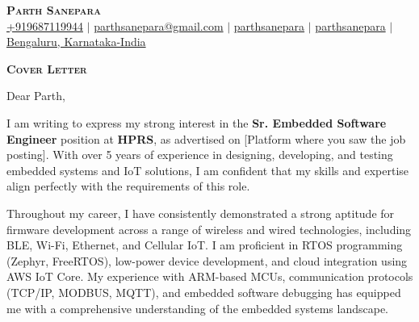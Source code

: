 \documentclass[letterpaper,11pt]{article}
\newcommand{\HiringManager}{Parth}
\newcommand{\CompanyName}{HPRS}
\newcommand{\Position}{Sr. Embedded Software Engineer}
\begin{document}

\begin{center}
    \textbf{\Huge \scshape Parth Sanepara} \\ \vspace{3pt}
    \small
    \faMobile \hspace{.5pt} \href{tel:9687119944}{+919687119944}
    $|$
    \faAt \hspace{.5pt} \href{mailto:parthsanepara@gmail.com}{parthsanepara@gmail.com}
    $|$
    \faLinkedinSquare \hspace{.5pt} \href{https://www.linkedin.com/in/parthsanepara}{parthsanepara}
    $|$
    \faGithub \hspace{.5pt} \href{https://github.com/parthsanepara}{parthsanepara}
    $|$
    \faMapMarker \hspace{.5pt} \href{https://maps.app.goo.gl/cc5ibm6jAiXmRFp17}{Bengaluru, Karnataka-India}
\end{center}

\vspace{2cm}

\begin{center}
    \textbf{\Large \scshape Cover Letter} \\ \vspace{3pt}
\end{center}

\vspace{1cm}

  Dear \HiringManager{},\\ \vspace{3pt}

  I am writing to express my strong interest in the \textbf{\Position{}} position at \textbf{\CompanyName{}}, 
  as advertised on [Platform where you saw the job posting]. With over 5 years of experience in designing, developing,
  and testing embedded systems and IoT solutions, I am confident that my skills and expertise align perfectly with the 
  requirements of this role. \\ \vspace{3pt}

  Throughout my career, I have consistently demonstrated a strong aptitude for firmware development across a range of 
  wireless and wired technologies, including BLE, Wi-Fi, Ethernet, and Cellular IoT. I am proficient in RTOS programming 
  (Zephyr, FreeRTOS), low-power device development, and cloud integration using AWS IoT Core. My experience with ARM-based MCUs, 
  communication protocols (TCP/IP, MODBUS, MQTT), and embedded software debugging has equipped me with a comprehensive 
  understanding of the embedded systems landscape. \\ \vspace{3pt}
\end{document}
